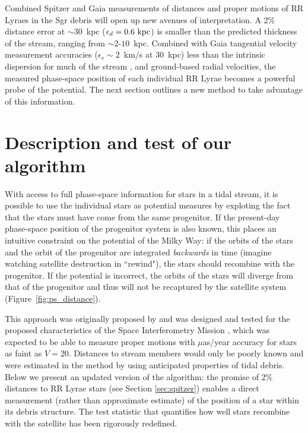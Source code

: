 \documentclass[preprint]{aastex}
\begin{document}
Combined Spitzer and Gaia measurements of distances and proper motions
of RR Lyraes in the Sgr debris will open up new avenues of
interpretation. A 2\% distance error at $\sim$30~kpc
($\epsilon_{d}=0.6~{\rm kpc}$) is smaller than the predicted thickness
of the stream, ranging from $\sim$2-$10$~kpc. Combined with Gaia
tangential velocity measurement accuracies ($\epsilon_{v}\sim2$~km/s
at 30~kpc) less than the intrinsic dispersion for much of the stream
\citep[$\sigma_v\sim10$~km/s;][]{majewski04}, and ground-based radial
velocities, the measured phase-space position of each individual RR
Lyrae becomes a powerful probe of the potential. The next section
outlines a new method to take advantage of this information.

\section{Description and test of our algorithm}
\label{sec:method}
With access to full phase-space information for stars in a tidal
stream, it is possible to use the individual stars as potential
measures by exploting the fact that the stars must have come from the
same progenitor. If the present-day phase-space position of the
progenitor system is also known, this places an intuitive constraint
on the potential of the Milky Way: if the orbits of the stars and the
orbit of the progenitor are integrated \emph{backwards} in time
(imagine watching satellite destruction in ``rewind"), the stars
should recombine with the progenitor. If the potential is incorrect,
the orbits of the stars will diverge from that of the progenitor and
thus will not be recaptured by the satellite system
(Figure~\ref{fig:ps_distance}).

This approach was originally proposed by \citep{johnston99a} and was
designed and tested for the proposed characteristics of the Space
Interferometry Mission \citep{unwin08}, which was expected to be able
to measure proper motions with $\mu$as/year accuracy for stars as
faint as $V=20$. Distances to stream members would only be poorly
known and were estimated in the method by using anticipated properties
of tidal debris. Below we present an updated version of the algorithm:
the promise of 2\% distances to RR Lyrae stars (see Section
\ref{sec:spitzer}) enables a direct measurement (rather than
approximate estimate) of the position of a star within its debris
structure. The test statistic that quantifies how well stars recombine
with the satellite has been rigorously redefined.
\end{document}
